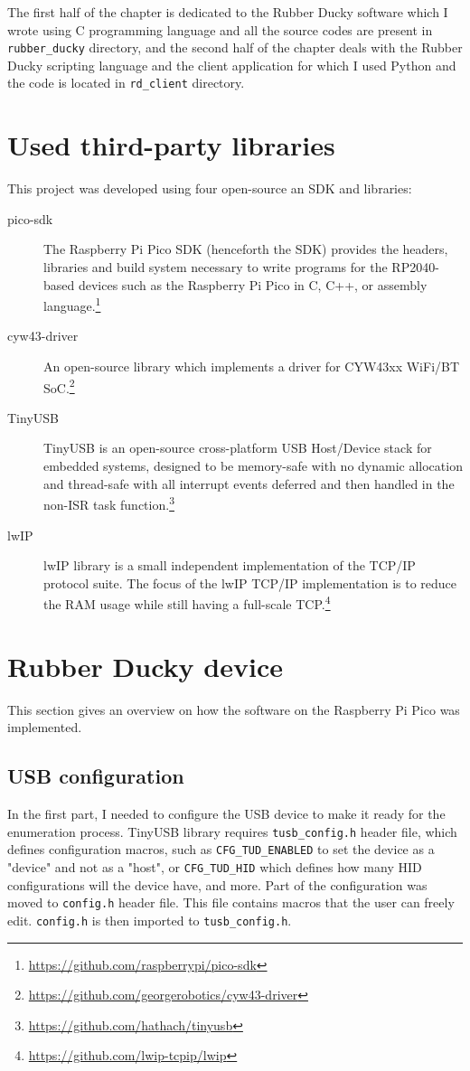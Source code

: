 The first half of the chapter is dedicated to the Rubber Ducky software which I wrote using C programming language and all the source codes are present in \verb|rubber_ducky| directory, and the second half of the chapter deals with the Rubber Ducky scripting language and the client application for which I used Python and the code is located in \verb|rd_client| directory.

\section{Used third-party libraries}
This project was developed using four open-source an SDK and libraries:
\begin{description}
    \item [pico-sdk] The Raspberry Pi Pico SDK (henceforth the SDK) provides the headers, libraries and build system necessary to write programs for the RP2040-based devices such as the Raspberry Pi Pico in C, C++, or assembly language.\footnote{\url{https://github.com/raspberrypi/pico-sdk}}
    \item [cyw43-driver] An open-source library which implements a driver for CYW43xx WiFi/BT SoC.\footnote{\url{https://github.com/georgerobotics/cyw43-driver}}
    \item [TinyUSB] TinyUSB is an open-source cross-platform USB Host/Device stack for embedded systems, designed to be memory-safe with no dynamic allocation and thread-safe with all interrupt events deferred and then handled in the non-ISR task function.\footnote{\url{https://github.com/hathach/tinyusb}}
    \item [lwIP] lwIP library is a small independent implementation of the TCP/IP protocol suite. The focus of the lwIP TCP/IP implementation is to reduce the RAM usage while still having a full-scale TCP.\footnote{\url{https://github.com/lwip-tcpip/lwip}}
\end{description}

\section{Rubber Ducky device}
This section gives an overview on how the software on the Raspberry Pi Pico was implemented.

\subsection{USB configuration}
In the first part, I needed to configure the USB device to make it ready for the enumeration process. TinyUSB library requires \verb|tusb_config.h| header file, which defines configuration macros, such as \verb|CFG_TUD_ENABLED| to set the device as a "device" and not as a "host", or \verb|CFG_TUD_HID| which defines how many HID configurations will the device have, and more. Part of the configuration was moved to \verb|config.h| header file. This file contains macros that the user can freely edit. \verb|config.h| is then imported to \verb|tusb_config.h|.

